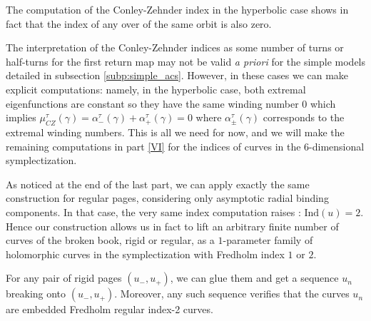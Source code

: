 \documentclass[../main.tex]{subfiles}
\begin{document}
\begin{remark}\label{r:CZ_hyperbolic}
The computation of the Conley-Zehnder index in the hyperbolic case shows in fact that the index of any over of the same orbit is also zero.
\end{remark}

\begin{remark}
The interpretation of the Conley-Zehnder indices as some number of turns or half-turns for the first return map may not be valid \textit{a priori} for the simple models detailed in subsection \ref{subp:simple_acs}. However, in these cases we can make explicit computations: namely, in the hyperbolic case, both extremal eigenfunctions are constant so they have the same winding number $0$ which implies $\mu_{CZ}^\tau(\gamma) = \alpha_-^\tau(\gamma) + \alpha_+^\tau(\gamma) = 0$ where $\alpha_\pm^\tau(\gamma)$ corresponds to the extremal winding numbers. This is all we need for now, and we will make the remaining computations in part \ref{VI} for the indices of curves in the $6$-dimensional symplectization.
\end{remark}

\begin{remark}
   As noticed at the end of the last part, we can apply exactly the same construction for regular pages, considering only asymptotic radial binding components. In that case, the very same index computation raises : $\text{Ind}(u) = 2$. Hence our construction allows us in fact to lift an arbitrary finite number of curves of the broken book, rigid or regular, as a $1$-parameter family of holomorphic curves in the symplectization with Fredholm index $1$ or $2$. 
\end{remark}

\begin{lemma}\label{l:gluing_rigid_pages}
For any pair of rigid pages $(u_-,u_+)$, we can glue them and get a sequence $u_n$ breaking onto $(u_-,u_+)$. Moreover, any such sequence verifies that the curves $u_n$ are embedded Fredholm regular index-2 curves.
\end{lemma}
\end{document}
